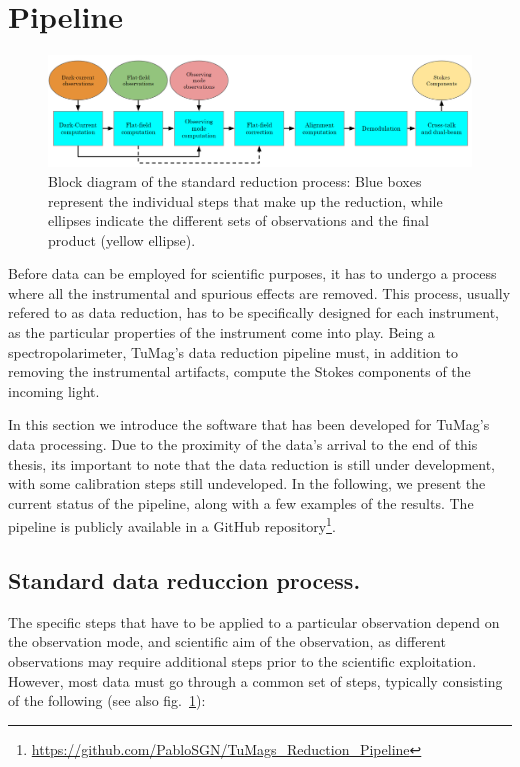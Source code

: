 \section{Pipeline}

\begin{figure}[t]
  \includegraphics[width=\textwidth]{figures/Pipeline/pipeline_diagram.PNG}
  \caption[Reduction pipeline block diagram.]{
    Block diagram of the standard reduction process: Blue boxes represent the individual steps that make up the reduction, while ellipses indicate the different sets of observations and the final product (yellow ellipse). }
    \label{fig_pipeline: block_diagram}
\end{figure}

Before data can be employed for scientific purposes, it has to undergo a process where all the instrumental and spurious effects are removed. This process, usually refered to as data reduction, has to be specifically designed for each instrument, as the particular properties of the instrument come into play. Being a spectropolarimeter, TuMag's data reduction pipeline must, in addition to removing the instrumental artifacts, compute the Stokes components of the incoming light.

In this section we introduce the software that has been developed for TuMag's data processing. Due to the proximity of the data's arrival to the end of this thesis, its important to note that the data reduction is still under development, with some calibration steps still undeveloped. In the following, we present the current status of the pipeline, along with a few examples of the results. The pipeline is publicly available in a GitHub repository\footnote{\url{https://github.com/PabloSGN/TuMags_Reduction_Pipeline}}.  

\subsection{Standard data reduccion process.}

The specific steps that have to be applied to a particular observation depend on the observation mode, and scientific aim of the observation, as different observations  may require additional steps prior to the scientific exploitation. However, most data must go through a common set of steps, typically consisting of the following (see also fig.~\ref{fig_pipeline: block_diagram}):

